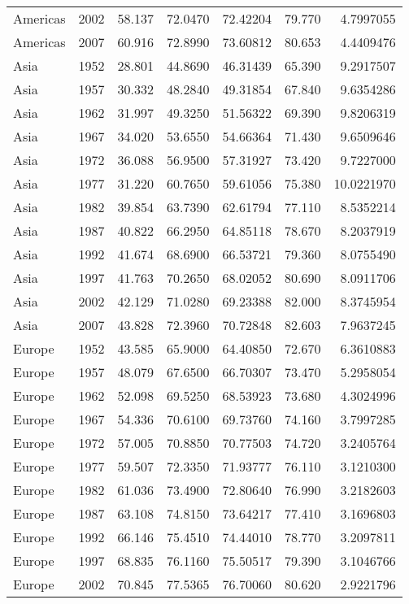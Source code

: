 \documentclass[
]{article}
\begin{document}
\begin{longtable}[]{@{}lrrrrrr@{}}
Americas & 2002 & 58.137 & 72.0470 & 72.42204 & 79.770 & 4.7997055 \\
Americas & 2007 & 60.916 & 72.8990 & 73.60812 & 80.653 & 4.4409476 \\
Asia & 1952 & 28.801 & 44.8690 & 46.31439 & 65.390 & 9.2917507 \\
Asia & 1957 & 30.332 & 48.2840 & 49.31854 & 67.840 & 9.6354286 \\
Asia & 1962 & 31.997 & 49.3250 & 51.56322 & 69.390 & 9.8206319 \\
Asia & 1967 & 34.020 & 53.6550 & 54.66364 & 71.430 & 9.6509646 \\
Asia & 1972 & 36.088 & 56.9500 & 57.31927 & 73.420 & 9.7227000 \\
Asia & 1977 & 31.220 & 60.7650 & 59.61056 & 75.380 & 10.0221970 \\
Asia & 1982 & 39.854 & 63.7390 & 62.61794 & 77.110 & 8.5352214 \\
Asia & 1987 & 40.822 & 66.2950 & 64.85118 & 78.670 & 8.2037919 \\
Asia & 1992 & 41.674 & 68.6900 & 66.53721 & 79.360 & 8.0755490 \\
Asia & 1997 & 41.763 & 70.2650 & 68.02052 & 80.690 & 8.0911706 \\
Asia & 2002 & 42.129 & 71.0280 & 69.23388 & 82.000 & 8.3745954 \\
Asia & 2007 & 43.828 & 72.3960 & 70.72848 & 82.603 & 7.9637245 \\
Europe & 1952 & 43.585 & 65.9000 & 64.40850 & 72.670 & 6.3610883 \\
Europe & 1957 & 48.079 & 67.6500 & 66.70307 & 73.470 & 5.2958054 \\
Europe & 1962 & 52.098 & 69.5250 & 68.53923 & 73.680 & 4.3024996 \\
Europe & 1967 & 54.336 & 70.6100 & 69.73760 & 74.160 & 3.7997285 \\
Europe & 1972 & 57.005 & 70.8850 & 70.77503 & 74.720 & 3.2405764 \\
Europe & 1977 & 59.507 & 72.3350 & 71.93777 & 76.110 & 3.1210300 \\
Europe & 1982 & 61.036 & 73.4900 & 72.80640 & 76.990 & 3.2182603 \\
Europe & 1987 & 63.108 & 74.8150 & 73.64217 & 77.410 & 3.1696803 \\
Europe & 1992 & 66.146 & 75.4510 & 74.44010 & 78.770 & 3.2097811 \\
Europe & 1997 & 68.835 & 76.1160 & 75.50517 & 79.390 & 3.1046766 \\
Europe & 2002 & 70.845 & 77.5365 & 76.70060 & 80.620 & 2.9221796 \\

\end{longtable}
\end{document}
